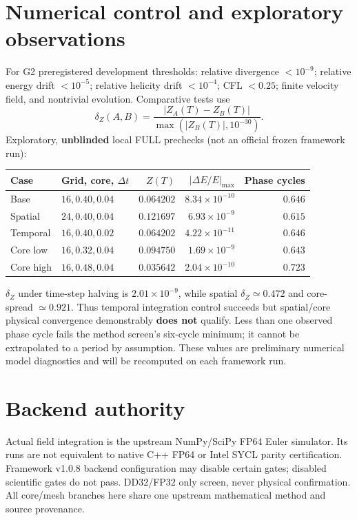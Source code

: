 \documentclass[11pt,a4paper]{article}
\begin{document}
\section{Numerical control and exploratory observations}
For G2 preregistered development thresholds: relative divergence $<10^{-9}$; relative energy drift $<10^{-5}$; relative helicity drift $<10^{-4}$; CFL $<0.25$; finite velocity field, and nontrivial evolution. Comparative tests use
\begin{equation}\delta_Z(A,B)=\frac{|Z_A(T)-Z_B(T)|}{\max(|Z_B(T)|,10^{-30})}.\end{equation}
Exploratory, \textbf{unblinded} local FULL prechecks (not an official frozen framework run):
\begin{center}\begin{tabular}{llrrr}\toprule
Case & Grid, core, $\Delta t$ & $Z(T)$ & $|\Delta E/E|_{\max}$ & Phase cycles\\\midrule
Base & $16,0.40,0.04$ & $0.064202$ & $8.34\times10^{-10}$ & $0.646$\\
Spatial & $24,0.40,0.04$ & $0.121697$ & $6.93\times10^{-9}$ & $0.615$\\
Temporal & $16,0.40,0.02$ & $0.064202$ & $4.22\times10^{-11}$ & $0.646$\\
Core low & $16,0.32,0.04$ & $0.094750$ & $1.69\times10^{-9}$ & $0.643$\\
Core high & $16,0.48,0.04$ & $0.035642$ & $2.04\times10^{-10}$ & $0.723$\\\bottomrule\end{tabular}\end{center}
$\delta_Z$ under time-step halving is $2.01\times10^{-9}$, while spatial $\delta_Z\simeq0.472$ and core-spread $\simeq0.921$. Thus temporal integration control succeeds but spatial/core physical convergence demonstrably \textbf{does not} qualify. Less than one observed phase cycle fails the method screen's six-cycle minimum; it cannot be extrapolated to a period by assumption. These values are preliminary numerical model diagnostics and will be recomputed on each framework run.

\section{Backend authority}
Actual field integration is the upstream NumPy/SciPy FP64 Euler simulator. Its runs are not equivalent to native C++ FP64 or Intel SYCL parity certification. Framework v1.0.8 backend configuration may disable certain gates; disabled scientific gates do not pass. DD32/FP32 only screen, never physical confirmation. All core/mesh branches here share one upstream mathematical method and source provenance.
\end{document}
